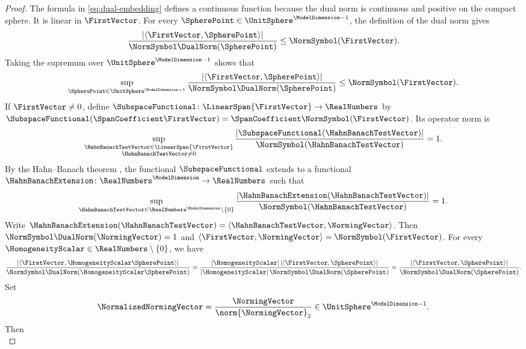 \begin{proof}
The formula in \eqref{eq:dual-embedding} defines a continuous function
because the dual norm is continuous and positive on the compact sphere.
It is linear in
$\FirstVector$.
For every
$\SpherePoint\in\UnitSphere^{\ModelDimension-1}$,
the definition of the dual norm gives
\[
 \frac{|\langle\FirstVector,\SpherePoint\rangle|}
      {\NormSymbol\DualNorm(\SpherePoint)}
 \leq\NormSymbol(\FirstVector).
\]
Taking the supremum over
$\UnitSphere^{\ModelDimension-1}$
shows that
\begin{equation}\label{eq:dual-embedding-upper-bound}
 \sup_{\SpherePoint\in\UnitSphere^{\ModelDimension-1}}
 \frac{|\langle\FirstVector,\SpherePoint\rangle|}
      {\NormSymbol\DualNorm(\SpherePoint)}
 \leq\NormSymbol(\FirstVector).
\end{equation}
If
$\FirstVector\ne0$,
define
$\SubspaceFunctional\colon\LinearSpan\{\FirstVector\}\to\RealNumbers$
 by
 $\SubspaceFunctional(\SpanCoefficient\FirstVector)=\SpanCoefficient\NormSymbol(\FirstVector)$.
Its operator norm is
\[
 \sup_{\substack{\HahnBanachTestVector\in\LinearSpan\{\FirstVector\}\\\HahnBanachTestVector\ne0}}
 \frac{|\SubspaceFunctional(\HahnBanachTestVector)|}{\NormSymbol(\HahnBanachTestVector)}=1.
\]
By the Hahn--Banach theorem
\cite[Theorem~11.19 and Proposition~11.20]{Muscat2024},
the functional
$\SubspaceFunctional$
extends to a functional
$\HahnBanachExtension\colon\RealNumbers^\ModelDimension\to\RealNumbers$
such that
\[
 \sup_{\HahnBanachTestVector\in\RealNumbers^\ModelDimension\setminus\{0\}}
 \frac{|\HahnBanachExtension(\HahnBanachTestVector)|}{\NormSymbol(\HahnBanachTestVector)}=1.
\]
Write
$\HahnBanachExtension(\HahnBanachTestVector)=\langle\HahnBanachTestVector,\NormingVector\rangle$.
Then
$\NormSymbol\DualNorm(\NormingVector)=1$
and
$\langle\FirstVector,\NormingVector\rangle=\NormSymbol(\FirstVector)$.
For every
$\HomogeneityScalar\in\RealNumbers\setminus\{0\}$,
we have
\[
 \frac{|\langle\FirstVector,\HomogeneityScalar\SpherePoint\rangle|}
      {\NormSymbol\DualNorm(\HomogeneityScalar\SpherePoint)}
 =\frac{|\HomogeneityScalar|\,|\langle\FirstVector,\SpherePoint\rangle|}
        {|\HomogeneityScalar|\,\NormSymbol\DualNorm(\SpherePoint)}
 =\frac{|\langle\FirstVector,\SpherePoint\rangle|}
        {\NormSymbol\DualNorm(\SpherePoint)}.
\]
Set
\[
 \NormalizedNormingVector
 =\frac{\NormingVector}{\norm{\NormingVector}_2}
 \in\UnitSphere^{\ModelDimension-1}.
\]
Then
\begin{equation}\label{eq:dual-embedding-lower-bound}

\end{equation}
\end{proof}
